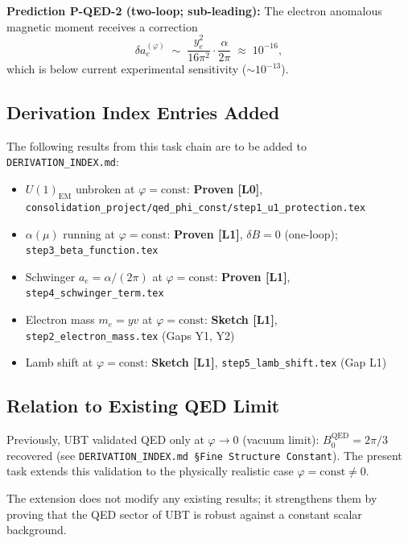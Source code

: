 \documentclass[12pt]{article}
\begin{document}
\begin{predbox}
\textbf{Prediction P-QED-2 (two-loop; sub-leading):}
The electron anomalous magnetic moment receives a correction
\[
  \delta a_e^{(\varphi)} \;\sim\; \frac{y_e^2}{16\pi^2}\cdot\frac{\alpha}{2\pi}
  \;\approx\; 10^{-16},
\]
which is below current experimental sensitivity ($\sim 10^{-13}$).
\end{predbox}

\subsection{Derivation Index Entries Added}

The following results from this task chain are to be added to \texttt{DERIVATION\_INDEX.md}:

\begin{itemize}
  \item $U(1)_\mathrm{EM}$ unbroken at $\varphi = \mathrm{const}$: \textbf{Proven [L0]},
        \texttt{consolidation\_project/qed\_phi\_const/step1\_u1\_protection.tex}
  \item $\alpha(\mu)$ running at $\varphi = \mathrm{const}$: \textbf{Proven [L1]},
        $\delta B=0$ (one-loop); \texttt{step3\_beta\_function.tex}
  \item Schwinger $a_e = \alpha/(2\pi)$ at $\varphi = \mathrm{const}$: \textbf{Proven [L1]},
        \texttt{step4\_schwinger\_term.tex}
  \item Electron mass $m_e = yv$ at $\varphi = \mathrm{const}$: \textbf{Sketch [L1]},
        \texttt{step2\_electron\_mass.tex} (Gaps Y1, Y2)
  \item Lamb shift at $\varphi = \mathrm{const}$: \textbf{Sketch [L1]},
        \texttt{step5\_lamb\_shift.tex} (Gap L1)
\end{itemize}

\subsection{Relation to Existing QED Limit}

Previously, UBT validated QED only at $\varphi \to 0$ (vacuum limit):
$B_0^\mathrm{QED} = 2\pi/3$ recovered (see \texttt{DERIVATION\_INDEX.md §Fine Structure Constant}).
The present task extends this validation to the physically realistic case
$\varphi = \mathrm{const} \neq 0$.

The extension does not modify any existing results; it strengthens them by proving that
the QED sector of UBT is robust against a constant scalar background.
\end{document}
